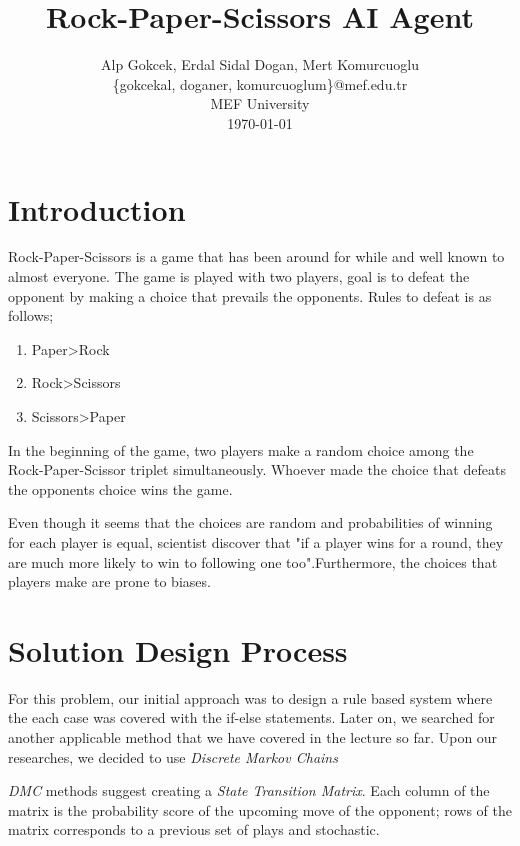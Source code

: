 \documentclass{IEEEtran}
\author{Alp Gokcek, Erdal Sidal Dogan, Mert Komurcuoglu\\\{gokcekal, doganer, komurcuoglum\}@mef.edu.tr\\ MEF University \\ \today}
\title{Rock-Paper-Scissors AI Agent}
\begin{document}
	\maketitle
	\section{Introduction}
	
	Rock-Paper-Scissors is a game that has been around for while and well known to almost everyone. The game is played with two players, goal is to defeat the opponent by making a choice that prevails the opponents. Rules to defeat is as follows;
	
	\begin{enumerate}
		\item Paper\textgreater Rock
		\item Rock\textgreater Scissors	
		\item Scissors\textgreater Paper
	\end{enumerate}
	
	In the beginning of the game, two players make a random choice among the Rock-Paper-Scissor triplet simultaneously. Whoever made the choice that defeats the opponents choice wins the game.
	
	Even though it seems that the choices are random and probabilities of winning for each player is equal, scientist discover that "if a player wins for a round, they are much more likely to win to following one too".Furthermore, the choices that players make are prone to biases. \cite{winning-rps} 
	
	\section{Solution Design Process}
	
	For this problem, our initial approach was to design a rule based system where the each case was covered with the if-else statements. Later on, we searched for another applicable method that we have covered in the lecture so far. Upon our researches, we decided to use \textit{Discrete Markov Chains}
	
	\textit{DMC} methods suggest creating a \textit{State Transition Matrix}. Each column of the matrix is the probability score of the upcoming move of the opponent; rows of the matrix corresponds to a previous set of plays and stochastic. \\
	
\end{document}
